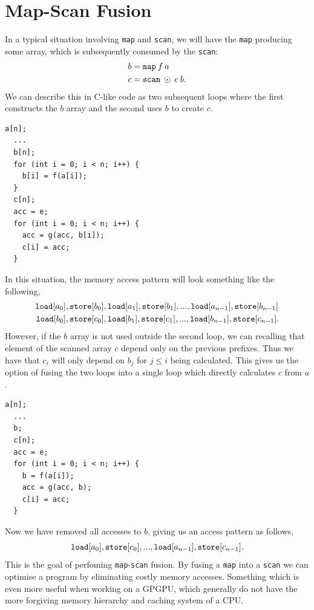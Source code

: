 \documentclass[11pt]{article}
\begin{document}
\section{Map-Scan Fusion}
In a typical situation involving \texttt{map} and \texttt{scan}, we will have the \texttt{map} producing some array, which is subsequently
 consumed by the \texttt{scan}:
\begin{align*}
  b &= \mathtt{map} \: f \: a \\
  c &= \mathtt{scan} \: \odot \: e \: b\mathnormal{.}
\end{align*}
We can describe this in C-like code as two subsequent loops where the first constructs the $b$ array and the second uses $b$ to create $c$.
\begin{lstlisting}[caption=\texttt{map} and \texttt{scan} in C-like code.]
  a[n];
  ...
  b[n];
  for (int i = 0; i < n; i++) {
    b[i] = f(a[i]);
  }
  c[n];
  acc = e;
  for (int i = 0; i < n; i++) {
    acc = g(acc, b[i]);
    c[i] = acc;
  }
\end{lstlisting}
In this situation, the memory access pattern will look something like the following,
\begin{align*}
  \mathtt{load}[a_0]&, \mathtt{store}[b_0], \mathtt{load}[a_1], \mathtt{store}[b_1], ..., \mathtt{load}[a_{n-1}], \mathtt{store}[b_{n-1}] \\
  \mathtt{load}[b_0]&, \mathtt{store}[c_0], \mathtt{load}[b_1], \mathtt{store}[c_1], ..., \mathtt{load}[b_{n-1}], \mathtt{store}[c_{n-1}]\mathnormal{.}
\end{align*}
However, if the $b$ array is not used outside the second loop, we can recalling that element of the scanned array $c$ depend only on the previous prefixes. 
Thus we have that $c_i$ will only depend on $b_j$ for $j \leq i$ being calculated. This gives us the option of fusing the two loops into a single loop which directly calculates $c$ from $a$.
\begin{lstlisting}[caption=\texttt{map} and \texttt{scan} loops fused.]
  a[n];
  ...
  b;
  c[n];
  acc = e;
  for (int i = 0; i < n; i++) {
    b = f(a[i]);
    acc = g(acc, b);
    c[i] = acc;
  }
\end{lstlisting}
Now we have removed all accesses to $b$, giving us an access pattern as follows,
 $$\mathtt{load}[a_0],  \mathtt{store}[c_0], ..., \mathtt{load}[a_{n-1}],  \mathtt{store}[c_{n-1}]\mathnormal{.}$$
This is the goal of perfoming \texttt{map}-\texttt{scan} fusion. By fusing a \texttt{map} into a \texttt{scan} we can optimise a program by eliminating costly memory accesses.
 Something which is even more useful when working on a GPGPU, which generally do not have the more forgiving memory hierarchy and caching system of a CPU.
\end{document}
